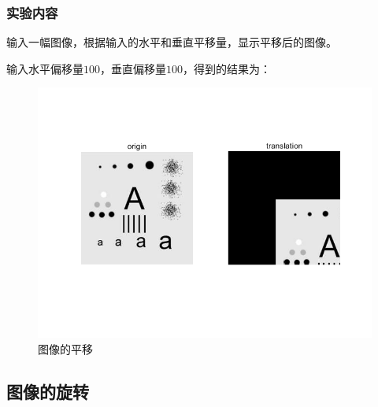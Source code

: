 \documentclass{ctexart}
\begin{document}
\subsubsection{\hei 实验内容}
输入一幅图像，根据输入的水平和垂直平移量，显示平移后的图像。
\par 输入水平偏移量$100$，垂直偏移量$100$，得到的结果为：
\begin{figure}[H]
    \centering
    \includegraphics[scale=0.5]{1_1.png}
    \caption{图像的平移}
\end{figure}

\subsection{\hei 图像的旋转}
\end{document}

